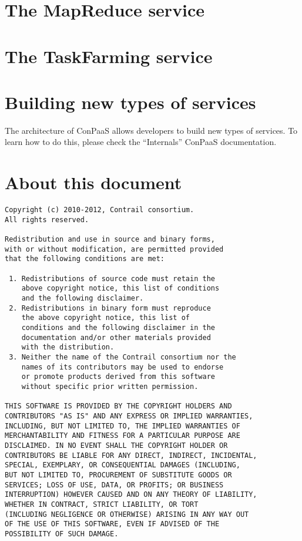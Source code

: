 \documentclass[10pt]{article}
\begin{document}
\section{The MapReduce service}

\section{The TaskFarming service}

\section{Building new types of services}

The architecture of ConPaaS allows developers to build new types of
services. To learn how to do this, please check the ``Internals''
ConPaaS documentation.

\section{About this document}

\begin{verbatim}
Copyright (c) 2010-2012, Contrail consortium.
All rights reserved.

Redistribution and use in source and binary forms, 
with or without modification, are permitted provided
that the following conditions are met:

 1. Redistributions of source code must retain the
    above copyright notice, this list of conditions
    and the following disclaimer.
 2. Redistributions in binary form must reproduce
    the above copyright notice, this list of 
    conditions and the following disclaimer in the
    documentation and/or other materials provided
    with the distribution.
 3. Neither the name of the Contrail consortium nor the
    names of its contributors may be used to endorse
    or promote products derived from this software 
    without specific prior written permission.

THIS SOFTWARE IS PROVIDED BY THE COPYRIGHT HOLDERS AND
CONTRIBUTORS "AS IS" AND ANY EXPRESS OR IMPLIED WARRANTIES,
INCLUDING, BUT NOT LIMITED TO, THE IMPLIED WARRANTIES OF
MERCHANTABILITY AND FITNESS FOR A PARTICULAR PURPOSE ARE
DISCLAIMED. IN NO EVENT SHALL THE COPYRIGHT HOLDER OR
CONTRIBUTORS BE LIABLE FOR ANY DIRECT, INDIRECT, INCIDENTAL,
SPECIAL, EXEMPLARY, OR CONSEQUENTIAL DAMAGES (INCLUDING, 
BUT NOT LIMITED TO, PROCUREMENT OF SUBSTITUTE GOODS OR 
SERVICES; LOSS OF USE, DATA, OR PROFITS; OR BUSINESS 
INTERRUPTION) HOWEVER CAUSED AND ON ANY THEORY OF LIABILITY,
WHETHER IN CONTRACT, STRICT LIABILITY, OR TORT
(INCLUDING NEGLIGENCE OR OTHERWISE) ARISING IN ANY WAY OUT
OF THE USE OF THIS SOFTWARE, EVEN IF ADVISED OF THE
POSSIBILITY OF SUCH DAMAGE.
\end{verbatim}
\end{document}
